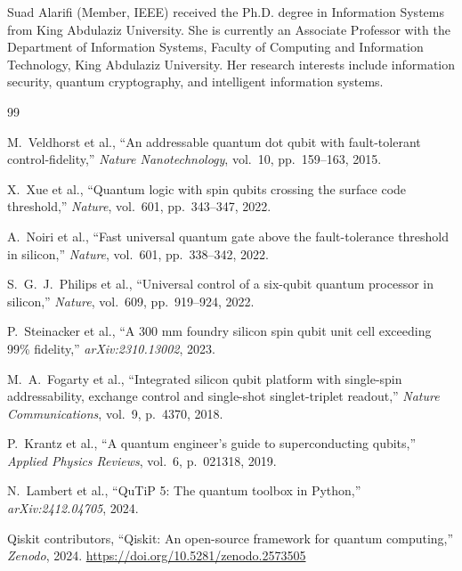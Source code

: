 \documentclass[journal]{IEEEtran}
\begin{document}
\begin{IEEEbiography}{Suad Alarifi}
(Member, IEEE) received the Ph.D. degree in Information Systems from King
Abdulaziz University. She is currently an Associate Professor with the
Department of Information Systems, Faculty of Computing and Information
Technology, King Abdulaziz University. Her research interests include
information security, quantum cryptography, and intelligent information systems.
\end{IEEEbiography}


\begin{thebibliography}{99}

M.~Veldhorst et al.,
``An addressable quantum dot qubit with fault-tolerant control-fidelity,''
\textit{Nature Nanotechnology}, vol.~10, pp.~159--163, 2015.

X.~Xue et al.,
``Quantum logic with spin qubits crossing the surface code threshold,''
\textit{Nature}, vol.~601, pp.~343--347, 2022.

A.~Noiri et al.,
``Fast universal quantum gate above the fault-tolerance threshold in silicon,''
\textit{Nature}, vol.~601, pp.~338--342, 2022.

S.~G.~J.~Philips et al.,
``Universal control of a six-qubit quantum processor in silicon,''
\textit{Nature}, vol.~609, pp.~919--924, 2022.

P.~Steinacker et al.,
``A 300 mm foundry silicon spin qubit unit cell exceeding 99\% fidelity,''
\textit{arXiv:2310.13002}, 2023.

M.~A.~Fogarty et al.,
``Integrated silicon qubit platform with single-spin addressability,
exchange control and single-shot singlet-triplet readout,''
\textit{Nature Communications}, vol.~9, p.~4370, 2018.

P.~Krantz et al.,
``A quantum engineer's guide to superconducting qubits,''
\textit{Applied Physics Reviews}, vol.~6, p.~021318, 2019.

N.~Lambert et al.,
``QuTiP 5: The quantum toolbox in Python,''
\textit{arXiv:2412.04705}, 2024.

{Qiskit contributors},
``Qiskit: An open-source framework for quantum computing,''
\textit{Zenodo}, 2024. \url{https://doi.org/10.5281/zenodo.2573505}


\end{thebibliography}
\end{document}
